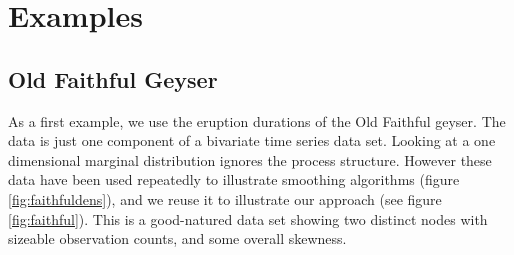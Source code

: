 \documentclass[dvips,12pt,a4paper,twoside]{amsart}
\begin{document}
%
%
\clearpage
%
%
\section{Examples}
%
\subsection{Old Faithful Geyser}
%
As a first example, we use the eruption durations of the Old Faithful geyser. The data is just one component of a bivariate time series data set. 
Looking at a one dimensional marginal distribution ignores the process structure. However these data have been used repeatedly to illustrate smoothing algorithms (figure \ref{fig:faithfuldens}), and we reuse it to illustrate our approach (see figure \ref{fig:faithful}). This is a good-natured data set showing two distinct nodes  with sizeable observation counts, and some overall skewness.

\end{document}
